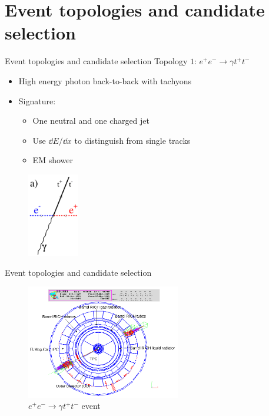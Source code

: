 \documentclass{beamer}
\begin{document}
\section{Event topologies and candidate selection}
\begin{frame}{Event topologies and candidate selection}
  Topology $1$: $e^+e^-\to\gamma t^+t^-$
  \begin{itemize}
    \item{High energy photon back-to-back with tachyons}
    \item{Signature:}
    \begin{itemize}
      \item{One neutral and one charged jet}
      \item{Use $\dd{E}/\dd{x}$ to distinguish from single tracks}
      \item{EM shower}
    \end{itemize}
  \end{itemize}
  \begin{figure}
    \centering
    \includegraphics[width = 0.2\textwidth]{TopologyA.png}
  \end{figure}
\end{frame}

\begin{frame}{Event topologies and candidate selection}
  \begin{figure}
    \centering
    \includegraphics[width = 0.6\textwidth]{Topology1.png}
    \caption{$e^+e^-\to \gamma t^+t^-$ event}
  \end{figure}
\end{frame}
\end{document}
